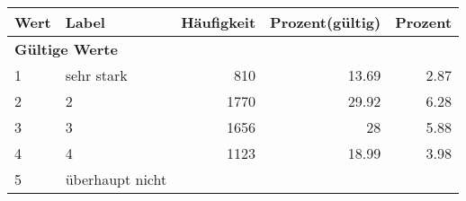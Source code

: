      \begin{longtable}{lXrrr}
     \toprule
     \textbf{Wert} & \textbf{Label} & \textbf{Häufigkeit} & \textbf{Prozent(gültig)} & \textbf{Prozent} \\
     \endhead
     \midrule
     \multicolumn{5}{l}{\textbf{Gültige Werte}}\\

     1 &
     \multicolumn{1}{X}{ sehr stark   } &


       \num{810} &
       \num[round-mode=places,round-precision=2]{13.69} &
         \num[round-mode=places,round-precision=2]{2.87} \\

     2 &
     \multicolumn{1}{X}{ 2   } &


       \num{1770} &
       \num[round-mode=places,round-precision=2]{29.92} &
         \num[round-mode=places,round-precision=2]{6.28} \\

     3 &
     \multicolumn{1}{X}{ 3   } &


       \num{1656} &
       \num[round-mode=places,round-precision=2]{28} &
         \num[round-mode=places,round-precision=2]{5.88} \\

     4 &
     \multicolumn{1}{X}{ 4   } &


       \num{1123} &
       \num[round-mode=places,round-precision=2]{18.99} &
         \num[round-mode=places,round-precision=2]{3.98} \\

     5 &
     \multicolumn{1}{X}{ überhaupt nicht   } &



\end{longtable}
